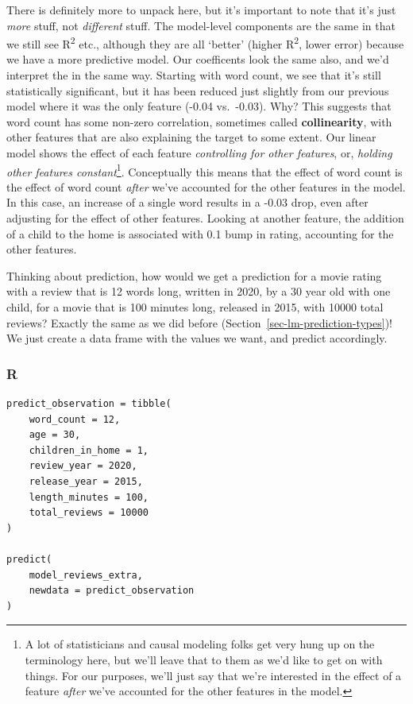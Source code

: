 \documentclass[
  letterpaper,
]{krantz}
\begin{document}
There is definitely more to unpack here, but it's important to note that
it's just \emph{more} stuff, not \emph{different} stuff. The model-level
components are the same in that we still see R\textsuperscript{2} etc.,
although they are all `better' (higher R\textsuperscript{2}, lower
error) because we have a more predictive model. Our coefficents look the
same also, and we'd interpret the in the same way. Starting with word
count, we see that it's still statistically significant, but it has been
reduced just slightly from our previous model where it was the only
feature (-0.04 vs.~-0.03). Why? This suggests that word count has some
non-zero correlation, sometimes called \textbf{collinearity}, with other
features that are also explaining the target to some extent. Our linear
model shows the effect of each feature \emph{controlling for other
features}, or, \emph{holding other features constant}\footnote{A lot of
  statisticians and causal modeling folks get very hung up on the
  terminology here, but we'll leave that to them as we'd like to get on
  with things. For our purposes, we'll just say that we're interested in
  the effect of a feature \emph{after} we've accounted for the other
  features in the model.}. Conceptually this means that the effect of
word count is the effect of word count \emph{after} we've accounted for
the other features in the model. In this case, an increase of a single
word results in a -0.03 drop, even after adjusting for the effect of
other features. Looking at another feature, the addition of a child to
the home is associated with 0.1 bump in rating, accounting for the other
features.

Thinking about prediction, how would we get a prediction for a movie
rating with a review that is 12 words long, written in 2020, by a 30
year old with one child, for a movie that is 100 minutes long, released
in 2015, with 10000 total reviews? Exactly the same as we did before
(Section~\ref{sec-lm-prediction-types})! We just create a data frame
with the values we want, and predict accordingly.

\subsubsection{R}

\begin{verbatim}
predict_observation = tibble(
    word_count = 12,
    age = 30,
    children_in_home = 1,
    review_year = 2020,
    release_year = 2015,
    length_minutes = 100,
    total_reviews = 10000
)

predict(
    model_reviews_extra,
    newdata = predict_observation
)
\end{verbatim}
\end{document}
